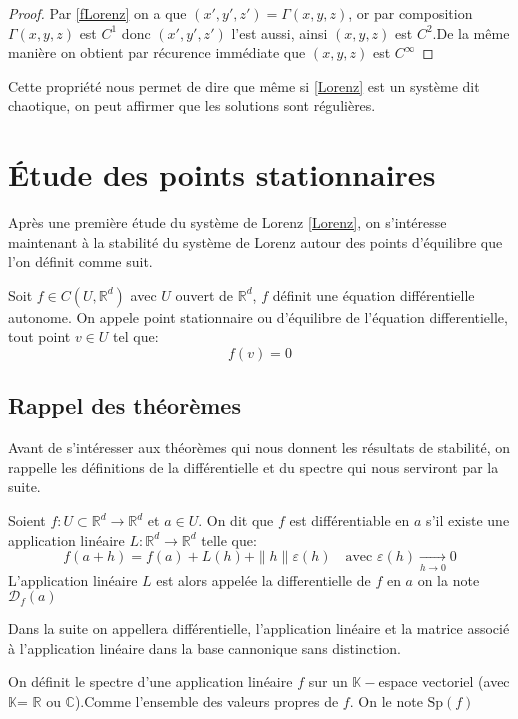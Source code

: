 \documentclass{article}
\newcommand{\R}{\mathbb{R}}
\newtheorem[M , nocut]{prop}{Proposition}[section]
\newtheorem[S , nocut]{definition}{Définition}
\newtheorem[S , nocut]{lemme}{Lemme}
\newtheorem[L , nocut]{thm}{Théoreme}
\newtheorem[L , nocut]{cor}{Corollaire}
\begin{document}
\begin{proof}
    Par \eqref{fLorenz} on a que $(x',y',z') = \Gamma(x,y,z)$, or par composition $\Gamma(x,y,z)$ est $C^1$ donc $(x',y',z')$ l'est aussi, ainsi $(x,y,z)$ est $C^2$.De la même manière on obtient par récurence immédiate que $(x,y,z)$ est $C^\infty$
\end{proof}

Cette propriété nous permet de dire que même si \eqref{Lorenz} est un système dit chaotique, on peut affirmer que les solutions sont régulières.

\newpage
\section{\'Etude des points stationnaires}

Après une première étude du système de Lorenz \eqref{Lorenz}, on s'intéresse maintenant à la stabilité du système de Lorenz autour des points d'équilibre que l'on définit comme suit.

\begin{definition}
    Soit $f\in C(U,\R^d)$ avec $U$ ouvert de $\R^d$, $f$ définit une équation différentielle autonome.
    On appele point stationnaire ou d'équilibre de l'équation differentielle, tout point $v \in U$ tel que:
    $$ f(v) = 0$$ 
\end{definition}

\subsection{Rappel des théorèmes}
\label{sec:Rappel-des-théorèmes}
Avant de s'intéresser aux théorèmes qui nous donnent les résultats de stabilité, on rappelle les définitions de la différentielle et du spectre qui nous serviront par la suite.
\begin{definition}
    Soient $f:U\subset \R^d \to \R^d$ et $a\in U$. On dit que $f$ est différentiable en $a$ s'il existe une application linéaire $L:\R^d\to\R^d$ telle que:
    $$f(a+h) = f(a) + L(h) + \|h\|\varepsilon(h)\quad \text{avec }\varepsilon(h)\xrightarrow[h\to 0]{}0$$ 
    L'application linéaire $L$ est alors appelée la differentielle de $f$ en $a$ on la note $\mathcal{D}_f(a)$
\end{definition}
\begin{example}[Remarque]
    Dans la suite on appellera différentielle, l'application linéaire et la matrice associé à l'application linéaire dans la base cannonique sans distinction.
\end{example}
\begin{definition}
    On définit le spectre d'une application linéaire $f$ sur un $\mathbb{K}-$espace vectoriel (avec $\mathbb{K}$= $\R$ ou $\mathbb{C}$).Comme l'ensemble des valeurs propres de $f$. On le note $\mathrm{Sp}(f)$
\end{definition}
\end{document}
